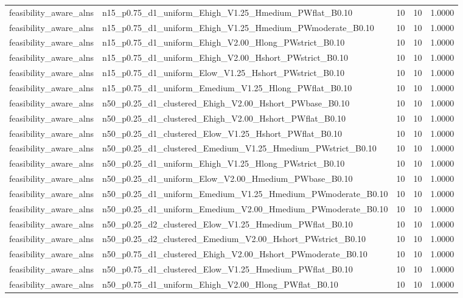 \begin{tabular}{llrrr}
feasibility_aware_alns & n15_p0.75_d1_uniform_Ehigh_V1.25_Hmedium_PWflat_B0.10 & 10 & 10 & 1.0000 \\
feasibility_aware_alns & n15_p0.75_d1_uniform_Ehigh_V1.25_Hmedium_PWmoderate_B0.10 & 10 & 10 & 1.0000 \\
feasibility_aware_alns & n15_p0.75_d1_uniform_Ehigh_V2.00_Hlong_PWstrict_B0.10 & 10 & 10 & 1.0000 \\
feasibility_aware_alns & n15_p0.75_d1_uniform_Ehigh_V2.00_Hshort_PWstrict_B0.10 & 10 & 10 & 1.0000 \\
feasibility_aware_alns & n15_p0.75_d1_uniform_Elow_V1.25_Hshort_PWstrict_B0.10 & 10 & 10 & 1.0000 \\
feasibility_aware_alns & n15_p0.75_d1_uniform_Emedium_V1.25_Hlong_PWflat_B0.10 & 10 & 10 & 1.0000 \\
feasibility_aware_alns & n50_p0.25_d1_clustered_Ehigh_V2.00_Hshort_PWbase_B0.10 & 10 & 10 & 1.0000 \\
feasibility_aware_alns & n50_p0.25_d1_clustered_Ehigh_V2.00_Hshort_PWflat_B0.10 & 10 & 10 & 1.0000 \\
feasibility_aware_alns & n50_p0.25_d1_clustered_Elow_V1.25_Hshort_PWflat_B0.10 & 10 & 10 & 1.0000 \\
feasibility_aware_alns & n50_p0.25_d1_clustered_Emedium_V1.25_Hmedium_PWstrict_B0.10 & 10 & 10 & 1.0000 \\
feasibility_aware_alns & n50_p0.25_d1_uniform_Ehigh_V1.25_Hlong_PWstrict_B0.10 & 10 & 10 & 1.0000 \\
feasibility_aware_alns & n50_p0.25_d1_uniform_Elow_V2.00_Hmedium_PWbase_B0.10 & 10 & 10 & 1.0000 \\
feasibility_aware_alns & n50_p0.25_d1_uniform_Emedium_V1.25_Hmedium_PWmoderate_B0.10 & 10 & 10 & 1.0000 \\
feasibility_aware_alns & n50_p0.25_d1_uniform_Emedium_V2.00_Hmedium_PWmoderate_B0.10 & 10 & 10 & 1.0000 \\
feasibility_aware_alns & n50_p0.25_d2_clustered_Elow_V1.25_Hmedium_PWflat_B0.10 & 10 & 10 & 1.0000 \\
feasibility_aware_alns & n50_p0.25_d2_clustered_Emedium_V2.00_Hshort_PWstrict_B0.10 & 10 & 10 & 1.0000 \\
feasibility_aware_alns & n50_p0.75_d1_clustered_Ehigh_V2.00_Hshort_PWmoderate_B0.10 & 10 & 10 & 1.0000 \\
feasibility_aware_alns & n50_p0.75_d1_clustered_Elow_V1.25_Hmedium_PWflat_B0.10 & 10 & 10 & 1.0000 \\
feasibility_aware_alns & n50_p0.75_d1_uniform_Ehigh_V2.00_Hlong_PWflat_B0.10 & 10 & 10 & 1.0000 \\

\end{tabular}
